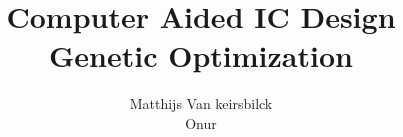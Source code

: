 \documentclass[a4paper,12pt]{article}
\begin{document}
\title{\LARGE {\bf Computer Aided IC Design \\ Genetic Optimization}\\
 \vspace*{6mm}
}
\author{Matthijs Van keirsbilck \\ Onur }
\submitdate{\today}

\maketitle %

\generatebody  %







\end{document}
